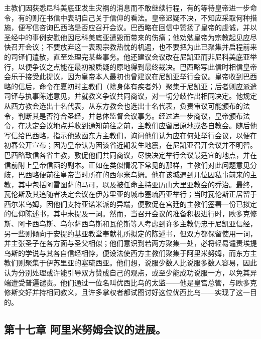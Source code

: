 主教们因获悉尼科美底亚发生灾祸的消息而不敢继续行程，有的等待皇帝进一步命令，有的则在书信中表明自己关于信仰的看法。皇帝迟疑不决，不知应采取何种措施，便写信咨询巴西略是否应召开会议。巴西略在回信中赞扬了皇帝的虔诚，并以圣经中的事例安慰他因尼科美底亚遭毁而带来的伤痛；他劝勉皇帝为宗教起见应尽快召开会议；不要放弃这一表现宗教热忱的机遇，也不要把为此已聚集并启程前来的司铎们遣散，直至处理完某些事务。他还建议会议改在尼凯亚而非尼科美底亚举行，以便争议之点能在最初被质疑的原地得到最终裁决。巴西略写此信时相信皇帝会乐于接受此提议，因为皇帝本人最初也曾建议在尼凯亚举行会议。皇帝收到巴西略的信后，命令在夏初时主教们（除身体有疾者外）聚集于尼凯亚；后者则应派遣司铎与执事陈述意见，并就教义争议共同商议，对一切分歧作出相同决定。他规定从西方教会选出十名代表，从东方教会也选出十名代表，负责审议可能颁布的法令，判断其是否符合圣经，并总体监督会议事务。经过进一步商议，皇帝颁布法令，在决定会议地点并收到通知前往之前，主教们应留居原地或各自教会。随后他写信给巴西略，指示他致函东方主教们，询问他们认为应在何处举行会议，以便在初春公开宣布；因为皇帝认为因该省近期发生地震，在尼凯亚召开会议并不明智。巴西略致信各省主教，敦促他们共同商议，尽快决定举行会议最适宜的地点，并在信前附上皇帝信函的副本。正如在类似情况下常见的那样，主教们对此问题意见分歧，巴西略便前往皇帝当时所在的西尔米乌姆。他在该城遇到几位因私事前来的主教，其中包括阿雷图萨的马可，以及被任命主持亚历山大里亚教会的乔治。最终，瓦伦斯及其追随者决定会议在伊苏里亚的城市塞琉西亚举行；当时瓦伦斯正居留于西尔米乌姆，因他们支持亚诺米派的异端，便敦促在宫廷的主教们签署一份已拟定的信仰陈述书，其中未提及一词。然而，当召开会议的准备积极进行时，欧多克修斯、阿卡西乌斯、乌尔萨西乌斯和瓦伦斯等人考虑到许多主教仍忠于尼凯亚信经，另一些则倾向于安提约基亚教堂奉献礼所拟定的陈述书，但双方都保留使用一词，并主张圣子在各方面与圣父相似；他们意识到若两方聚集一处，必将轻易谴责埃提乌斯的学说与其各自信经相悖，便设法使西方主教们聚集于阿里米努姆，而东方主教们则聚集于伊苏里亚的塞琉西亚。他们想，说服少数人比说服多数人容易，因此认为分别处理或许能引导双方赞成自己的观点，或至少能成功说服一方，以免其异端遭受普遍谴责。他们通过一位名叫优西比乌的太监——他是皇宫总管，与欧多克修斯交好并持相同教义，且许多掌权者都试图讨好这位优西比乌——实现了这一目的。\par


\subsection{第十七章 阿里米努姆会议的进展。}


